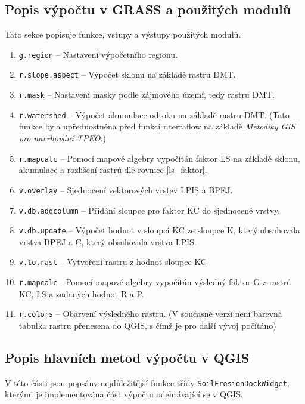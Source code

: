 \subsection{Popis výpočtu v GRASS a použitých modulů} Tato sekce
popisuje funkce, vstupy a výstupy použitých modulů.
\begin{enumerate}
	\item \texttt{g.region} – Nastavení výpočetního regionu.
	\item \texttt{r.slope.aspect} – Výpočet sklonu na základě
rastru DMT.
	\item \texttt{r.mask} – Nastavení masky podle zájmového území,
tedy rastru DMT.
	\item \texttt{r.watershed} – Výpočet akumulace odtoku na
základě rastru DMT. (Tato funkce byla upřednostněna před funkcí
r.terraflow na základě \textit{Metodiky GIS pro navrhování
TPEO}\cite{Dostal2014}.)
	\item \texttt{r.mapcalc} – Pomocí mapové algebry vypočítán
faktor LS na základě sklonu, akumulace a rozlišení rastrů dle rovnice
\ref{ls_faktor}.
	\item \texttt{v.overlay} – Sjednocení vektorových vrstev LPIS
a BPEJ.
	\item \texttt{v.db.addcolumn} – Přidání sloupce pro faktor KC
do sjednocené vrstvy.
	\item \texttt{v.db.update} – Výpočet hodnot v sloupci KC ze
sloupce K, který obsahovala vrstva BPEJ a C, který obsahovala vrstva
LPIS.
	\item \texttt{v.to.rast} – Vytvoření rastru z hodnot sloupce
KC
	\item \texttt{r.mapcalc} - Pomocí mapové algebry vypočítán
výsledný faktor G z rastrů KC, LS a zadaných hodnot R a P.
	\item \texttt{r.colors} – Obarvení výsledného rastru. (V
současné verzi není barevná tabulka rastru přenesena do QGIS, s čímž
je pro další vývoj počítáno)
\end{enumerate}
\newpage
\subsection{Popis hlavních metod výpočtu v QGIS} V této části jsou
popsány nejdůležitější funkce třídy \texttt{SoilErosionDockWidget},
kterými je implementována část výpočtu odehrávající se v QGIS.
